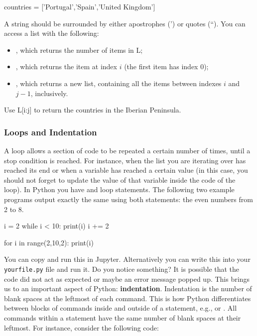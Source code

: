 \begin{python}
countries = ['Portugal','Spain','United Kingdom']
\end{python}

\noindent A string should be surrounded by either apostrophes (') or quotes (``). You can access a list with the following:

\begin{itemize}
 \item {}, which returns the number of items in L;
 \item {}, which returns the item at index $i$ (the first item has index 0);
 \item {}, which returns a new list, containing all the items between indexes $i$ and $j-1$, inclusively. 
\end{itemize}

\begin{exercise}
 Use L[i:j] to return the countries in the Iberian Peninsula.
\end{exercise}

\subsubsection{Loops and Indentation}

A loop allows a section of code to be repeated a certain number of times, until
a stop condition is reached. For instance, when the list you are iterating over has
reached its end or when a variable has reached a certain value (in this case,
you should not forget to update the value of that variable inside the code of
the loop). In Python you have  and  loop statements. The
following two example programs output exactly the same using both statements:
the even numbers from 2 to 8.

\begin{python}
i = 2
while i < 10:
  print(i)
  i += 2 
\end{python}

\begin{python}
for i in range(2,10,2):
    print(i)
\end{python}

You can copy and run this in Jupyter. Alternatively you can write this into your
\texttt{yourfile.py} file and run it. Do you notice something? It is possible
that the code did not act as expected or maybe an error message popped up. This
brings us to an important aspect of Python: \textbf{indentation}. Indentation
is the number of blank spaces at the leftmost of each command. This is how
Python differentiates between blocks of commands inside and outside of a
statement, e.g.,  or . All commands within a
statement have the same number of blank spaces at their leftmost. For instance,
consider the following code: 

